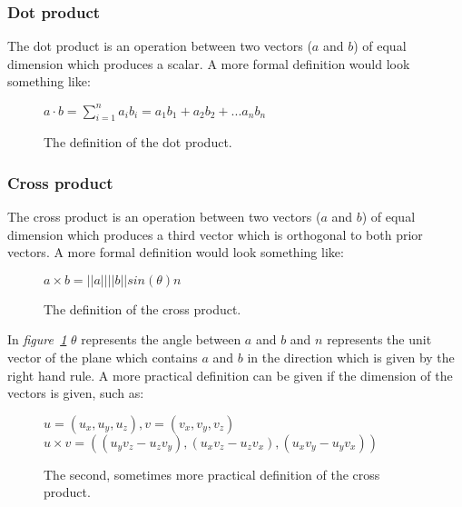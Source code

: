 \subsubsection{Dot product}

The dot product is an operation between two vectors ($a$ and $b$) of equal dimension which produces a scalar. A more formal definition would look something like:

\begin{figure}[H]
	\begin{center}
		$a \cdot b = \sum_{i=1}^{n}{a_ib_i = a_1b_1 + a_2b_2 + ... a_nb_n}$
		\caption{The definition of the dot product.}
	\end{center}
\end{figure}

\subsubsection{Cross product}

The cross product is an operation between two vectors ($a$ and $b$) of equal dimension which produces a third vector which is orthogonal to both prior vectors. A more formal definition would look something like:

\begin{figure}[H]
	\begin{center}
		$a \times b = \left\vert\left\vert a \right\vert\right\vert \left\vert\left\vert b \right\vert\right\vert sin(\theta) n$
		\caption{The definition of the cross product.}
		\label{cross-formula}
	\end{center}
\end{figure}

In \textit{figure~\ref{cross-formula}} $\theta$ represents the angle between $a$ and $b$ and $n$ represents the unit vector of the plane which contains $a$ and $b$ in the direction which is given by the right hand rule. A more practical definition can be given if the dimension of the vectors is given, such as:\cite{cross-howto}

\begin{figure}[H]
	\begin{center}
		$ u = (u_x, u_y, u_z), v = (v_x, v_y, v_z)$
		$ u \times v = ((u_y v_z - u_z v_y), (u_x v_z - u_z v_x), (u_x v_y - u_y v_x))$
		\caption{The second, sometimes more practical definition of the cross product.}
		\label{cross-formula-2}
	\end{center}
\end{figure}

